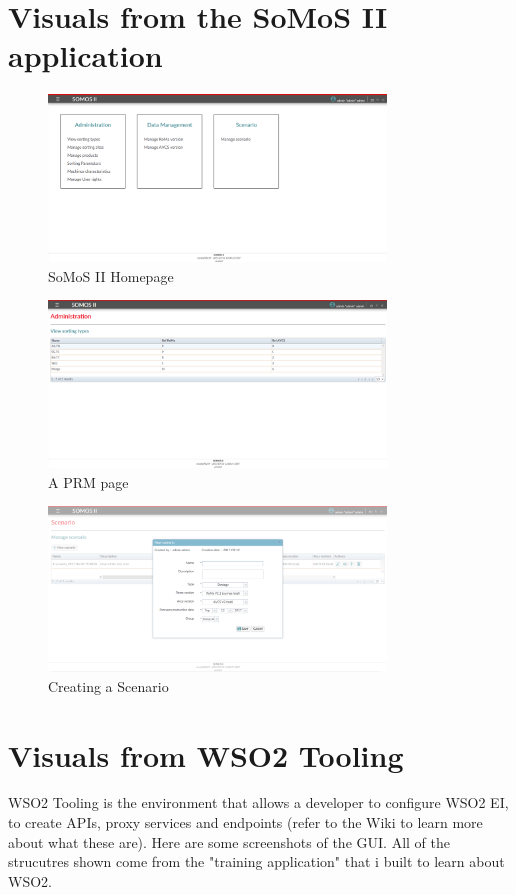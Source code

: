 \documentclass[12pt,a4paper,twoside]{article}
\begin{document}
\section*{Visuals from the SoMoS II application}
\begin{figure}[H]
\centering
\includegraphics[width=0.8\textwidth]{SOMOS2_1.PNG}
\caption{\label{SOMOS ACCUEIL}SoMoS II Homepage}
\end{figure}
\begin{figure}[H]
	\centering
	\includegraphics[width=0.8\textwidth]{SOMOS2_2.PNG}
	\caption{\label{SOMOS Sorting Types}A PRM page}
\end{figure}
\begin{figure}[H]
	\centering
	\includegraphics[width=0.8\textwidth]{SOMOS2_3.PNG}
	\caption{\label{SOMOS SCN}Creating a Scenario}
\end{figure}
\newpage

\section*{Visuals from WSO2 Tooling}
WSO2 Tooling is the environment that allows a developer to configure WSO2 EI, to create APIs, proxy services and endpoints (refer to the Wiki to learn more about what these are). Here are some screenshots of the GUI. All of the strucutres shown come from the "training application" that i built to learn about WSO2.
\end{document}
